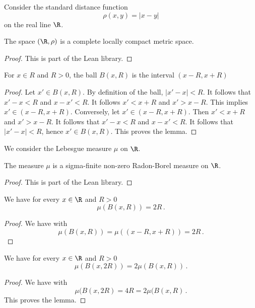 Consider the standard distance function
\begin{equation}
    \rho(x,y)=|x-y|
\end{equation}
on the real line $\R$.
\begin{lemma}
\label{real-line-metric}
The space $(\R,\rho)$ is a complete locally compact metric space.
\end{lemma}
\begin{proof}
    This is part of the Lean library.
\end{proof}
\begin{lemma}
\label{real-line-ball}
    \leanok
    For $x\in R$ and $R>0$, the ball $B(x,R)$ is the interval $(x-R,x+R)$
\end{lemma}
\begin{proof}
\leanok
Let $x'\in B(x,R)$. By definition of the ball,
$|x'-x|<R$. It follows that $x'-x<R$ and $x-x'<R$.
It follows $x'<x+R$ and $x'>x-R$. This implies
$x'\in (x-R,x+R)$.
Conversely, let $x'\in (x-R,x+R)$. Then
$x'<x+R$ and $x'>x-R$. It follows that
$x'-x<R$ and $x-x'<R$. It follows that $|x'-x|<R$,
hence $x'\in B(x,R)$.
This proves the lemma.
\end{proof}
We consider the Lebesgue measure $\mu$ on $\R$.
\begin{lemma}
\label{real-line-measure}
    The measure $\mu$ is a sigma-finite non-zero
    Radon-Borel measure on $\R$.
\end{lemma}
\begin{proof}
    This is part of the Lean library.
\end{proof}
\begin{lemma}
\label{real-line-ball-measure}
    \leanok
    We have for every $x\in \R$ and $R>0$
    \begin{equation}
        \mu(B(x,R))=2R\, .
    \end{equation}
\end{lemma}
\begin{proof}
\leanok
We have with 
\begin{equation}
    \mu(B(x,R))=\mu((x-R,x+R))=2R\, .
\end{equation}
\end{proof}

\begin{lemma}
\label{real-line-doubling}
    We have for every $x\in \R$ and $R>0$
    \begin{equation}
        \mu(B(x,2R))=2\mu(B(x,R))\, .
    \end{equation}
\end{lemma}
\begin{proof}
    We have with 
\begin{equation}
    \mu(B(x,2R)=4R=2\mu(B(x,R)\, .
\end{equation}
This proves the lemma.
\end{proof}


